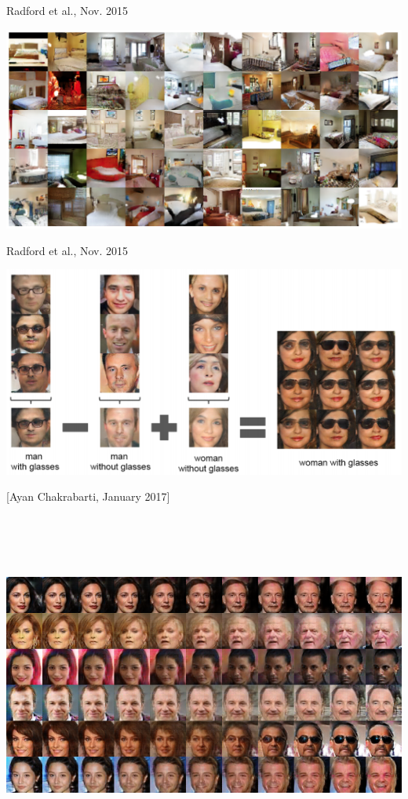 {
{Radford et al., Nov. 2015}

\centerline{\includegraphics[width = 9in]{../images/GANDCa}}

{Radford et al., Nov. 2015}

\centerline{\includegraphics[width = 9in]{../images/ImageFeatures}}


[Ayan Chakrabarti, January 2017]

\centerline{\includegraphics[height = 4.5in]{../images/interp}}

}
